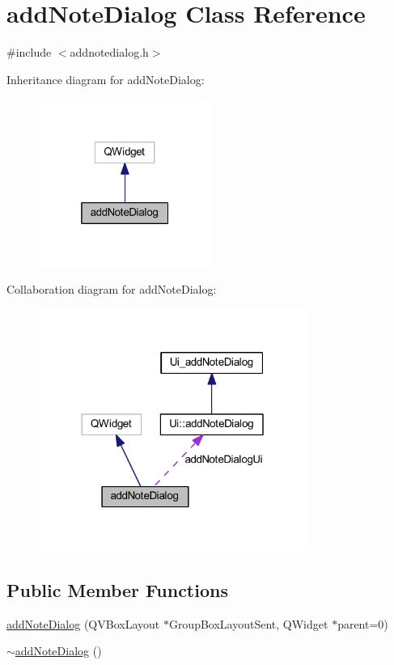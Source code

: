 \hypertarget{classaddNoteDialog}{}\section{add\+Note\+Dialog Class Reference}
\label{classaddNoteDialog}


{\ttfamily \#include $<$addnotedialog.\+h$>$}



Inheritance diagram for add\+Note\+Dialog\+:
\nopagebreak
\begin{figure}[H]
\begin{center}
\leavevmode
\includegraphics[width=160pt]{classaddNoteDialog__inherit__graph}
\end{center}
\end{figure}


Collaboration diagram for add\+Note\+Dialog\+:
\nopagebreak
\begin{figure}[H]
\begin{center}
\leavevmode
\includegraphics[width=249pt]{classaddNoteDialog__coll__graph}
\end{center}
\end{figure}
\subsection*{Public Member Functions}
\begin{DoxyCompactItemize}
\item 
\hyperlink{classaddNoteDialog_afc2d1dcbc9b0e6139859c61606c7f9f1}{add\+Note\+Dialog} (Q\+V\+Box\+Layout $\ast$Group\+Box\+Layout\+Sent, Q\+Widget $\ast$parent=0)
\item 
\hyperlink{classaddNoteDialog_a900c8ab72a54252fa03299d821af644f}{$\sim$add\+Note\+Dialog} ()
\end{DoxyCompactItemize}
